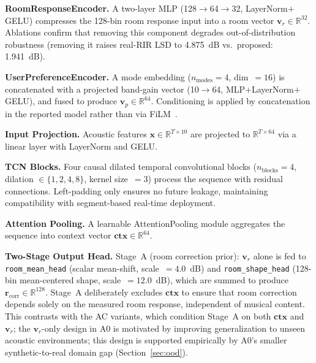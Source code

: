 \documentclass{aes2e}
\begin{document}
\textbf{RoomResponseEncoder.}
A two-layer MLP (128$\to$64$\to$32, LayerNorm$+$GELU) compresses the
128-bin room response input into a room vector
$\mathbf{v}_r \in \mathbb{R}^{32}$.
Ablations confirm that removing this component degrades
out-of-distribution robustness (removing it raises real-RIR LSD to 4.875~dB vs.\ proposed: 1.941~dB).

\textbf{UserPreferenceEncoder.}
A mode embedding ($n_\text{modes} = 4$, dim~$= 16$) is concatenated with a
projected band-gain vector (10$\to$64, MLP$+$LayerNorm$+$GELU), and fused
to produce $\mathbf{v}_p \in \mathbb{R}^{64}$.
Conditioning is applied by concatenation in the reported model rather than
via FiLM~\cite{perez2018}.

\textbf{Input Projection.}
Acoustic features $\mathbf{x} \in \mathbb{R}^{T \times 10}$ are projected
to $\mathbb{R}^{T \times 64}$ via a linear layer with LayerNorm and GELU.

\textbf{TCN Blocks.}
Four causal dilated temporal convolutional blocks
($n_\text{blocks} = 4$, dilation $\in \{1,2,4,8\}$, kernel size~$= 3$)
process the sequence with residual connections.
Left-padding only ensures no future leakage, maintaining compatibility
with segment-based real-time deployment.

\textbf{Attention Pooling.}
A learnable AttentionPooling module aggregates the sequence into context
vector $\mathbf{ctx} \in \mathbb{R}^{64}$.

\textbf{Two-Stage Output Head.}
Stage~A (room correction prior): $\mathbf{v}_r$ alone is fed to
\texttt{room\_mean\_head} (scalar mean-shift, scale~$= 4.0$~dB) and
\texttt{room\_shape\_head} (128-bin mean-centered shape,
scale~$= 12.0$~dB), which are summed to produce
$\mathbf{r}_\text{corr} \in \mathbb{R}^{128}$.
Stage~A deliberately excludes $\mathbf{ctx}$ to ensure that room correction
depends solely on the measured room response, independent of musical content.
This contrasts with the AC variants, which condition Stage~A on both
$\mathbf{ctx}$ and $\mathbf{v}_r$; the $\mathbf{v}_r$-only design in A0
is motivated by improving generalization to unseen acoustic
environments; this design is supported empirically by A0's
smaller synthetic-to-real domain gap (Section~\ref{sec:ood}).
\end{document}
